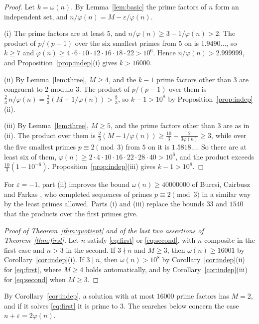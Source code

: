 \documentclass[11pt,reqno]{amsart}
\numberwithin{equation}{section}
\theoremstyle{plain}
\theoremstyle{definition}
\theoremstyle{remark}
\begin{document}
\begin{proof}
Let $k=\omega(n)$. By Lemma~\ref{lem:basic} the prime factors of $n$
form an independent set, and $n/\varphi(n)=M-\varepsilon/\varphi(n)$.

(i) The prime factors are at least $5$, and
$n/\varphi(n)\ge3-1/\varphi(n)>2$. The product of $p/(p-1)$ over the
six smallest primes from $5$ on is $1.9490\ldots$, so $k\ge7$ and
$\varphi(n)\ge4\cdot6\cdot10\cdot12\cdot16\cdot18\cdot22>10^6$. Hence
$n/\varphi(n)>2.999999$, and Proposition~\ref{prop:indep}(i) gives
$k>16000$.

(ii) By Lemma~\ref{lem:three}, $M\ge4$, and the $k-1$ prime factors
other than $3$ are congruent to $2$ modulo $3$. The product of
$p/(p-1)$ over them is $\frac23\,n/\varphi(n)=\frac23(M+1/\varphi(n))>\frac83$,
so $k-1>10^8$ by Proposition~\ref{prop:indep}(ii).

(iii) By Lemma~\ref{lem:three}, $M\ge5$, and the prime factors other
than $3$ are as in (ii). The product over them is
$\frac23(M-1/\varphi(n))\ge\frac{10}3-\frac2{3\varphi(n)}\ge3$, while
over the five smallest primes $p\equiv2\pmod3$ from $5$ on it is
$1.5818\ldots$. So there are at least six of them,
$\varphi(n)\ge2\cdot4\cdot10\cdot16\cdot22\cdot28\cdot40>10^6$, and the
product exceeds $\frac{10}3(1-10^{-6})$. Proposition~\ref{prop:indep}(iii)
gives $k-1>10^8$.
\end{proof}

For $\varepsilon=-1$, part (ii) improves the bound $\omega(n)\ge40000000$
of Burcsi, Czirbusz and Farkas \cite{BCF11}, who completed sequences of
primes $p\equiv2\pmod3$ in a similar way by the least primes allowed.
Parts (i) and (iii) replace the bounds $33$ and $1540$ that the
products over the first primes give.

\begin{proof}[Proof of Theorem~\ref{thm:quotient} and of the last two
assertions of Theorem~\ref{thm:first}]
Let $n$ satisfy \eqref{eq:first} or \eqref{eq:second}, with $n$
composite in the first case and $n>3$ in the second. If $3\nmid n$ and
$M\ge3$, then $\omega(n)\ge16001$ by Corollary~\ref{cor:indep}(i). If
$3\mid n$, then $\omega(n)>10^8$ by Corollary~\ref{cor:indep}(ii) for
\eqref{eq:first}, where $M\ge4$ holds automatically, and by
Corollary~\ref{cor:indep}(iii) for \eqref{eq:second} when $M\ge3$.
\end{proof}

By Corollary~\ref{cor:indep}, a solution with at most $16000$ prime
factors has $M=2$, and if it solves \eqref{eq:first} it is prime to
$3$. The searches below concern the case $n+\varepsilon=2\varphi(n)$.
\end{document}
